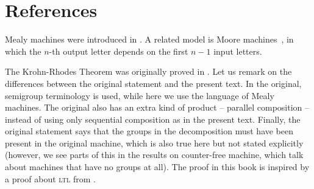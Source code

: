\section{References}
\label{sec:mealy-bib}

Mealy machines were introduced in \cite[Section 2.1]{mealy1955}. A related model is Moore machines~\cite[p.133]{moore1956}, in which the $n$-th output letter depends on the first $n-1$ input letters.

The Krohn-Rhodes Theorem  was originally proved in 
    \cite[p. 454]{krohnRhodes1965}. Let us remark on the differences between the original statement and the present text. In the original, semigroup terminology is used, while here we use the language of Mealy machines. The original also has an extra kind of product -- parallel composition -- instead of using only sequential composition as in the present text. Finally, the original statement says that the groups in the decomposition must have been present in the original machine, which is also true here but not stated explicitly (however, we see parts of this in the results on counter-free machine, which talk about machines that have no groups at all). The proof in this book is inspired by a proof about \textsc{ltl} from \cite[p.35]{wilke1999}.   